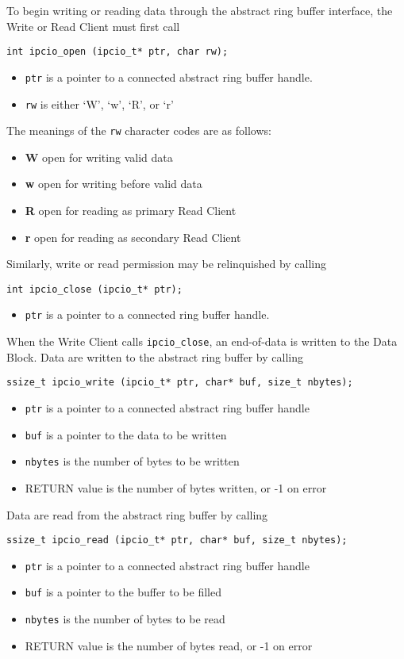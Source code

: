 To begin writing or reading data through the abstract ring buffer interface,
the Write or Read Client must first call
\begin{verbatim}
int ipcio_open (ipcio_t* ptr, char rw);
\end{verbatim}
\vspace{-3mm}
\begin{itemize}
\item {\tt ptr} is a pointer to a connected abstract ring buffer handle.
\item {\tt rw} is either `W', `w', `R', or `r'
\end{itemize}
The meanings of the {\tt rw} character codes are as follows:
\begin{itemize}
\item {\bf W} open for writing valid data
\item {\bf w} open for writing before valid data
\item {\bf R} open for reading as primary Read Client
\item {\bf r} open for reading as secondary Read Client
\end{itemize}
Similarly, write or read permission may be relinquished by calling
\begin{verbatim}
int ipcio_close (ipcio_t* ptr);
\end{verbatim}
\vspace{-3mm}
\begin{itemize}
\item {\tt ptr} is a pointer to a connected ring buffer handle.
\end{itemize}
When the Write Client calls {\tt ipcio\_close}, an end-of-data is written
to the Data Block. Data are written to the abstract ring buffer by calling
\begin{verbatim}
ssize_t ipcio_write (ipcio_t* ptr, char* buf, size_t nbytes);
\end{verbatim}
\vspace{-3mm}
\begin{itemize}
\item {\tt ptr} is a pointer to a connected abstract ring buffer handle
\item {\tt buf} is a pointer to the data to be written
\item {\tt nbytes} is the number of bytes to be written
\item RETURN value is the number of bytes written, or -1 on error
\end{itemize}
Data are read from the abstract ring buffer by calling
\begin{verbatim}
ssize_t ipcio_read (ipcio_t* ptr, char* buf, size_t nbytes);
\end{verbatim}
\vspace{-3mm}
\begin{itemize}
\item {\tt ptr} is a pointer to a connected abstract ring buffer handle
\item {\tt buf} is a pointer to the buffer to be filled
\item {\tt nbytes} is the number of bytes to be read
\item RETURN value is the number of bytes read, or -1 on error
\end{itemize}

